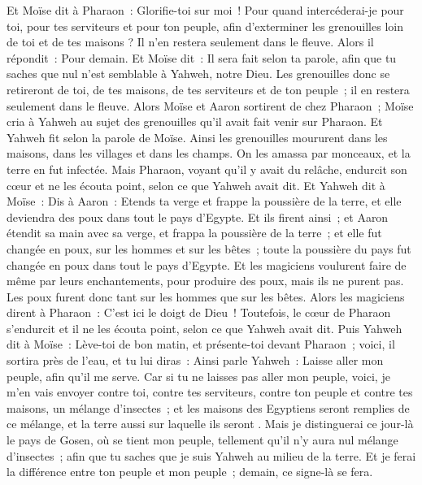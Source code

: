 \begin{multicols}{2}
Et Moïse dit à Pharaon~: Glorifie-toi sur moi~! Pour quand intercéderai-je pour toi, pour tes serviteurs et pour ton peuple, afin d'exterminer les grenouilles loin de toi et de tes maisons ? Il n'en restera seulement dans le fleuve. 
Alors il répondit~: Pour demain. Et Moïse dit~: Il sera fait selon ta parole, afin que tu saches que nul n'est semblable à Yahweh, notre Dieu.
Les grenouilles donc se retireront de toi, de tes maisons, de tes serviteurs et de ton peuple~; il en restera seulement dans le fleuve.
Alors Moïse et Aaron sortirent de chez Pharaon~; Moïse cria à Yahweh au sujet des grenouilles qu'il avait fait venir sur Pharaon.
Et Yahweh fit selon la parole de Moïse. Ainsi les grenouilles moururent dans les maisons, dans les villages et dans les champs.
On les amassa par monceaux, et la terre en fut infectée.
Mais Pharaon, voyant qu'il y avait du relâche, endurcit son cœur et ne les écouta point, selon ce que Yahweh avait dit.
Et Yahweh dit à Moïse~: Dis à Aaron~: Etends ta verge et frappe la poussière de la terre, et elle deviendra des poux dans tout le pays d'Egypte.
Et ils firent ainsi~; et Aaron étendit sa main avec sa verge, et frappa la poussière de la terre~; et elle fut changée en poux, sur les hommes et sur les bêtes~; toute la poussière du pays fut changée en poux dans tout le pays d'Egypte.
Et les magiciens voulurent faire de même par leurs enchantements, pour produire des poux, mais ils ne purent pas. Les poux furent donc tant sur les hommes que sur les bêtes.
Alors les magiciens dirent à Pharaon~: C'est ici le doigt de Dieu~! Toutefois, le cœur de Pharaon s'endurcit et il ne les écouta point, selon ce que Yahweh avait dit.
Puis Yahweh dit à Moïse~: Lève-toi de bon matin, et présente-toi devant Pharaon~; voici, il sortira près de l'eau, et tu lui diras~: Ainsi parle Yahweh~: Laisse aller mon peuple, afin qu'il me serve.
Car si tu ne laisses pas aller mon peuple, voici, je m'en vais envoyer contre toi, contre tes serviteurs, contre ton peuple et contre tes maisons, un mélange d'insectes~; et les maisons des Egyptiens seront remplies de ce mélange, et la terre aussi sur laquelle ils seront .
Mais je distinguerai ce jour-là le pays de Gosen, où se tient mon peuple, tellement qu'il n'y aura nul mélange d'insectes~; afin que tu saches que je suis Yahweh au milieu de la terre.
Et je ferai la différence entre ton peuple et mon peuple~; demain, ce signe-là se fera.

\end{multicols}
